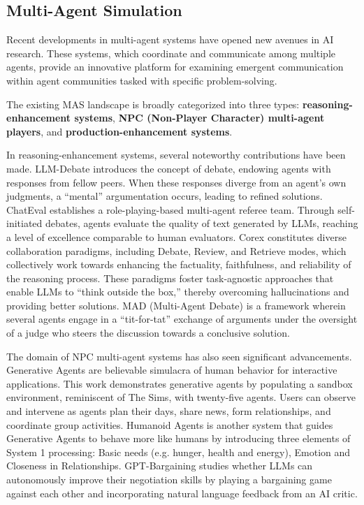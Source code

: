 \documentclass{article}
\newcommand{\yongfeng}[1]{{\small\color{blue}{\bf Yongfeng: #1}}}
\begin{document}
\subsection{Multi-Agent Simulation}
Recent developments in multi-agent systems have opened new avenues in AI research. These systems, which coordinate and communicate among multiple agents, provide an innovative platform for examining emergent communication within agent communities tasked with specific problem-solving. 

The existing MAS landscape is broadly categorized into three types: \textbf{reasoning-enhancement systems}, \textbf{NPC (Non-Player Character) multi-agent players}, and \textbf{production-enhancement systems}. 

In reasoning-enhancement systems, several noteworthy contributions have been made. LLM-Debate \cite{du2023improving} introduces the concept of debate, endowing agents with responses from fellow peers. When these responses diverge from an agent’s own judgments, a “mental” argumentation occurs, leading to refined solutions. ChatEval \cite{chan2023chateval} establishes a role-playing-based multi-agent referee team. Through self-initiated debates, agents evaluate the quality of text generated by LLMs, reaching a level of excellence comparable to human evaluators. Corex \cite{sun2023corex} constitutes diverse collaboration paradigms, including Debate, Review, and Retrieve modes, which collectively work towards enhancing the factuality, faithfulness, and reliability of the reasoning process. These paradigms foster task-agnostic approaches that enable LLMs to ``think outside the box,'' thereby overcoming hallucinations and providing better solutions. MAD (Multi-Agent Debate) \cite{liang2023encouraging} is a framework wherein several agents engage in a ``tit-for-tat'' exchange of arguments under the oversight of a judge who steers the discussion towards a conclusive solution.

The domain of NPC multi-agent systems has also seen significant advancements. Generative Agents \cite{park2023generative} are believable simulacra of human behavior for interactive applications. This work demonstrates generative agents by populating a sandbox environment, reminiscent of The Sims, with twenty-five agents. Users can observe and intervene as agents plan their days, share news, form relationships, and coordinate group activities. Humanoid Agents \cite{wang2023humanoid} is another system that guides Generative Agents to behave more like humans by introducing three elements of System 1 processing: Basic needs (e.g. hunger, health and energy), Emotion and Closeness in Relationships. GPT-Bargaining \cite{fu2023improving} studies whether LLMs can autonomously improve their negotiation skills by playing a bargaining game against each other and incorporating natural language feedback from an AI critic.
\end{document}
